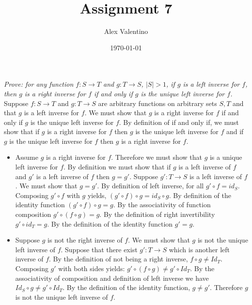 \documentclass[12pt, letterpaper]{article}
\date{\today}
\author{Alex Valentino}
\title{Assignment 7}
\begin{document}
	\textit{Prove: for any function $f: S \to T$ and $g: T \to S$, $|S| > 1$, if $g$ is a left inverse for $f$, then $g$ is a right inverse for $f$ if and only if $g$ is the unique left inverse for $f$.}\\
	Suppose $f: S \to T$ and $g: T \to S$ are arbitrary functions on arbitrary sets $S,T$ and that $g$ is a left inverse for $f$.  We must show that $g$ is a right inverse for $f$ if and only if $g$ is the unique left inverse for $f$.  By definition of if and only if, we must show that if $g$ is a right inverse for $f$ then $g$ is the unique left inverse for $f$ and if $g$ is the unique left inverse for $f$ then $g$ is a right inverse for $f$.
	\begin{itemize}
		\item Assume $g$ is a right inverse for $f$.  Therefore we must show that $g$ is a unique left inverse for $f$.  By definition we must show that if $g$ is a left inverse of $f$ and $g'$ is a left inverse of $f$ then $g=g'$.  Suppose $g': T \to S$ is a left inverse of $f$.  We must show that $g=g'$.  By definition of left inverse, for all $g' \circ f  = id_S.$  Composing $g' \circ f$ with $g$ yields, $(g' \circ f) \circ g = id_S \circ g.$  By definition of the identity function $(g' \circ f) \circ g = g.$  By the associativity of function composition $g' \circ (f \circ g) = g.$  By the definition of right invertibility $g' \circ id_T = g.$  By the definition of the identity function $g' = g.$
		\item Suppose $g$ is not the right inverse of $f$.  We must show that $g$ is not the unique left inverse of $f$. Suppose that there exist $g': T \to S$ which is another left inverse of $f$.  By the definition of not being a right inverse, $f \circ g \neq Id_T.$  Composing $g'$ with both sides yields: $g' \circ (f \circ g) \neq g' \circ Id_T$.  By the associativity of composition and definition of left inverse we have $ Id_S \circ  g \neq g' \circ Id_T.$  By the definition of the identity function, $g \neq g'$.  Therefore $g$ is not the unique left inverse of $f$.     
	\end{itemize}
\end{document}
